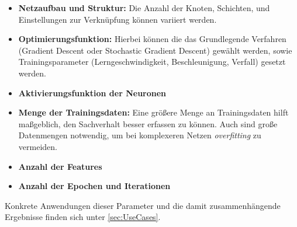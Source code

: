 \begin{itemize}
	\item \textbf{Netzaufbau und Struktur:} Die Anzahl der Knoten, Schichten, und Einstellungen zur Verknüpfung können variiert werden.
	\item \textbf{Optimierungsfunktion:} Hierbei können die das Grundlegende Verfahren (Gradient Descent oder Stochastic Gradient Descent) gewählt werden, sowie Trainingsparameter (Lerngeschwindigkeit, Beschleunigung, Verfall) gesetzt werden.
	\item \textbf{Aktivierungsfunktion der Neuronen}
	\item \textbf{Menge der Trainingsdaten:} Eine größere Menge an Trainingsdaten hilft maßgeblich, den Sachverhalt besser erfassen zu können. Auch sind große Datenmengen notwendig, um bei komplexeren Netzen \textit{overfitting} zu vermeiden.
	\item \textbf{Anzahl der Features} 
	\item \textbf{Anzahl der Epochen und Iterationen}
	
\end{itemize}

Konkrete Anwendungen dieser Parameter und die damit zusammenhängende Ergebnisse finden sich unter \ref{sec:UseCases}.